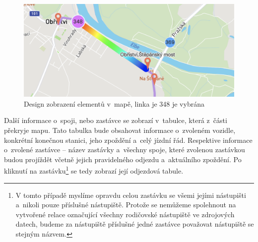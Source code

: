 \begin{figure}
\centering
  \includegraphics[width=0.5\linewidth]{../img/dve_vozidla.png}
  \caption{Design zobrazení elementů v~mapě, linka je 348 je vybrána}
  \label{fig:dve_vozidla}
\end{figure}

\bigbreak

Další informace o~spoji, nebo zastávce se zobrazí v~tabulce, která z~části překryje mapu. Tato tabulka bude obsahovat informace o~zvoleném vozidle, konkrétní konečnou stanici, jeho zpoždění a~celý jízdní řád. Respektive informace o~zvolené zastávce – název zastávky a~všechny spoje, které zvolenou zastávkou budou projíždět včetně jejich pravidelného odjezdu a~aktuálního zpoždění. Po kliknutí na zastávku\footnote{V tomto případě myslíme opravdu celou zastávku se všemi jejími nástupišti a~nikoli pouze příslušné nástupiště. Protože se nemůžeme spolehnout na vytvořené relace označující všechny rodičovské nástupiště ve zdrojových datech, budeme za nástupiště příslušné jedné zastávce považovat nástupiště se stejným názvem.} se tedy zobrazí její odjezdová tabule.
